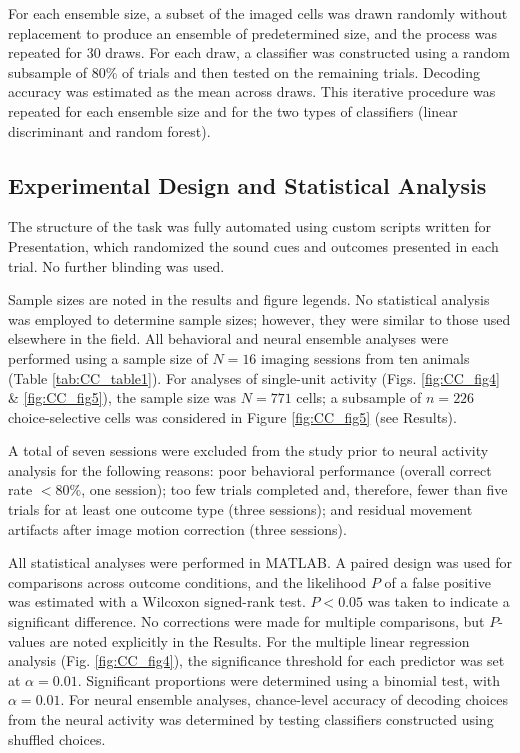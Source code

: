 For each ensemble size, a subset of the imaged cells was drawn randomly without replacement to produce an ensemble of predetermined size, and the process was repeated for 30 draws. For each draw, a classifier was constructed using a random subsample of 80\% of trials and then tested on the remaining trials. Decoding accuracy was estimated as the mean across draws. This iterative procedure was repeated for each ensemble size and for the two types of classifiers (linear discriminant and random forest).

\subsection*{Experimental Design and Statistical Analysis}
The structure of the task was fully automated using custom scripts written for Presentation, which randomized the sound cues and outcomes presented in each trial. No further blinding was used. 

Sample sizes are noted in the results and figure legends. No statistical analysis was employed to determine sample sizes; however, they were similar to those used elsewhere in the field. All behavioral and neural ensemble analyses were performed using a sample size of $N = 16$ imaging sessions from ten animals (Table \ref{tab:CC_table1}). For analyses of single-unit activity (Figs. \ref{fig:CC_fig4} \& \ref{fig:CC_fig5}), the sample size was $N = 771$ cells; a subsample of $n = 226$ choice-selective cells was considered in Figure \ref{fig:CC_fig5} (see Results). 

A total of seven sessions were excluded from the study prior to neural activity analysis for the following reasons: poor behavioral performance (overall correct rate $<80\%$, one session); too few trials completed and, therefore, fewer than five trials for at least one outcome type (three sessions); and residual movement artifacts after image motion correction (three sessions). 

All statistical analyses were performed in MATLAB. A paired design was used for comparisons across outcome conditions, and the likelihood $P$ of a false positive was estimated with a Wilcoxon signed-rank test. $P < 0.05$ was taken to indicate a significant difference. No corrections were made for multiple comparisons, but $P$-values are noted explicitly in the Results. For the multiple linear regression analysis (Fig. \ref{fig:CC_fig4}), the significance threshold for each predictor was set at $\alpha = 0.01$. Significant proportions were determined using a binomial test, with $\alpha = 0.01$. For neural ensemble analyses, chance-level accuracy of decoding choices from the neural activity was determined by testing classifiers constructed using shuffled choices.
